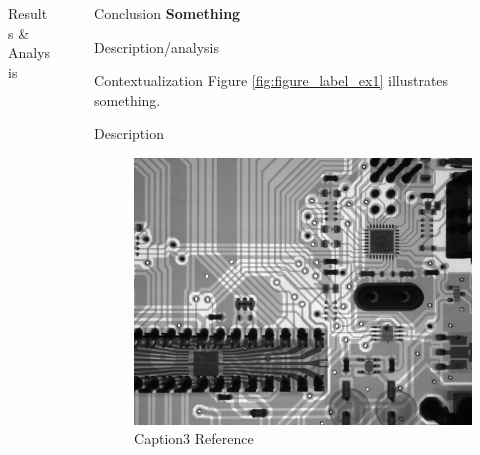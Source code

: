 \documentclass[final]{beamer}
\newlength{\sepwid}
\newlength{\onecolwid}
\newlength{\threecolwid}
\begin{document}
\begin{frame}[t]
\begin{columns}[t,totalwidth=\threecolwid]
\begin{column}{\onecolwid}
\begin{block}{Results \& Analysis}


\end{block}



\end{column} %

\begin{column}{\sepwid}\end{column} %

\begin{column}{\onecolwid} %

\begin{block}{Conclusion}
\textbf{Something}

Description/analysis
 
Contextualization
Figure \ref{fig:figure_label_ex1} illustrates something.

Description

\begin{figure}
	\label{fig:figure_label_ex3}
	\includegraphics[width=0.9\linewidth]{graphic_name3}
	\caption{Caption3 Reference \cite{call_tag_article}}
\end{figure}


\end{block}
\end{column}
\end{columns}
\end{frame}
\end{document}
